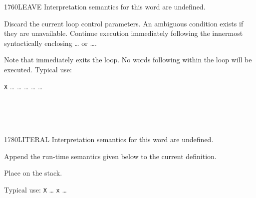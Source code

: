 \vspace*{-1ex}
\begin{worddef}{1760}{LEAVE}
\interpret
	Interpretation semantics for this word are undefined.

\execute
	\stack{}{}

	Discard the current loop control parameters. An ambiguous condition
	exists if they are unavailable. Continue execution immediately
	following the innermost syntactically enclosing
	\ldots{} or \ldots{}.


	\begin{rationale} %
		Note that  immediately exits the loop. No words
		following  within the loop will be executed.
		Typical use:

		\tab \word{:} \texttt{X} {\ldots} 
			{\ldots} 
				{\ldots} 
			 {\ldots}  {\ldots}
		\word{;}
	\end{rationale}

	\begin{testing} %
		 \\
		 \\
		 \\
	\end{testing}
\end{worddef}

\vspace*{-1ex}
\begin{worddef}{1780}{LITERAL}
\interpret
	Interpretation semantics for this word are undefined.

\compile

	Append the run-time semantics given below to the current definition.

\runtime

	Place  on the stack.

	\begin{rationale} %
		Typical use:
			\word{:} \texttt{X} {\ldots}
				\word{[} \texttt{x} \word{]} 
			{\ldots} \word{;}
	\end{rationale}

	\begin{testing} %
		 \\
	\end{testing}
\end{worddef}


